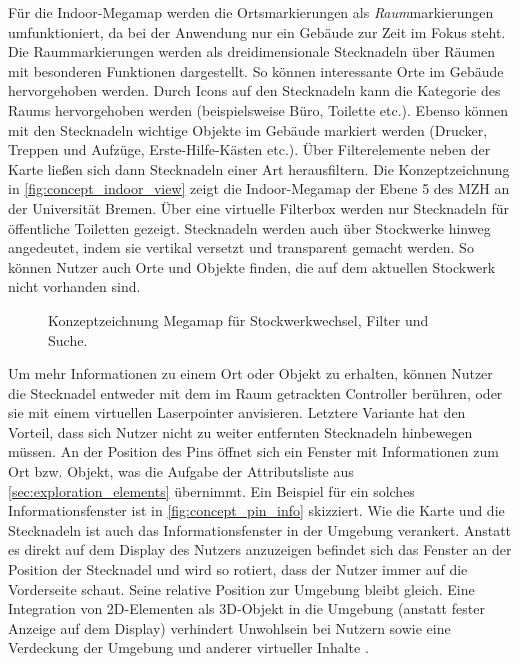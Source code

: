 Für die Indoor-Megamap werden die Ortsmarkierungen als \emph{Raum}markierungen umfunktioniert, da bei der Anwendung nur ein Gebäude zur Zeit im Fokus steht.
Die Raummarkierungen werden als dreidimensionale Stecknadeln über Räumen mit besonderen Funktionen dargestellt.
So können interessante Orte im Gebäude hervorgehoben werden.
Durch Icons auf den Stecknadeln kann die Kategorie des Raums hervorgehoben werden (beispielsweise Büro, Toilette etc.).
Ebenso können mit den Stecknadeln wichtige Objekte im Gebäude markiert werden (Drucker, Treppen und Aufzüge, Erste-Hilfe-Kästen etc.).
Über Filterelemente neben der Karte ließen sich dann Stecknadeln einer Art herausfiltern.
Die Konzeptzeichnung in \autoref{fig:concept_indoor_view} zeigt die Indoor-Megamap der Ebene 5 des MZH an der Universität Bremen.
Über eine virtuelle Filterbox werden nur Stecknadeln für öffentliche Toiletten gezeigt.
Stecknadeln werden auch über Stockwerke hinweg angedeutet, indem sie vertikal versetzt und transparent gemacht werden.
So können Nutzer auch Orte und Objekte finden, die auf dem aktuellen Stockwerk nicht vorhanden sind.
\vfill
\begin{figure}[h]
	\centering
	\caption{Konzeptzeichnung Megamap für Stockwerkwechsel, Filter und Suche.}
	\label{fig:concept_indoor_view}
\end{figure}

Um mehr Informationen zu einem Ort oder Objekt zu erhalten, können Nutzer die Stecknadel entweder mit dem im Raum getrackten Controller berühren, oder sie mit einem virtuellen Laserpointer anvisieren.
Letztere Variante hat den Vorteil, dass sich Nutzer nicht zu weiter entfernten Stecknadeln hinbewegen müssen.
An der Position des Pins öffnet sich ein Fenster mit Informationen zum Ort bzw. Objekt, was die Aufgabe der Attributsliste aus \autoref{sec:exploration_elements} übernimmt.
Ein Beispiel für ein solches Informationsfenster ist in \autoref{fig:concept_pin_info} skizziert.
Wie die Karte und die Stecknadeln ist auch das Informationsfenster in der Umgebung verankert.
Anstatt es direkt auf dem Display des Nutzers anzuzeigen befindet sich das Fenster an der Position der Stecknadel und wird so rotiert, dass der Nutzer immer auf die Vorderseite schaut.
Seine relative Position zur Umgebung bleibt gleich.
Eine Integration von 2D-Elementen als 3D-Objekt in die Umgebung (anstatt fester Anzeige auf dem Display) verhindert Unwohlsein bei Nutzern sowie eine Verdeckung der Umgebung und anderer virtueller Inhalte \parencite[23]{Schroeder2017}.

